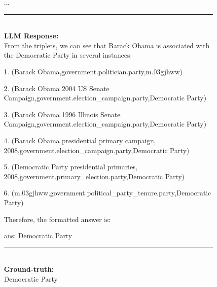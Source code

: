 \begin{figure}
\begin{tcolorbox}[colback=gray!5!white, colframe=gray!75!black, title=WebQSP-WebQTest-760]
...

\rule{\linewidth}{0.4pt}
\\

\textbf{LLM Response:}\\
From the triplets, we can see that Barack Obama is associated with the Democratic Party in several instances:



1. (Barack Obama,government.politician.party,m.03gjhww)

2. (Barack Obama 2004 US Senate Campaign,government.election\_campaign.party,Democratic Party)

3. (Barack Obama 1996 Illinois Senate Campaign,government.election\_campaign.party,Democratic Party)

4. (Barack Obama presidential primary campaign, 2008,government.election\_campaign.party,Democratic Party)

5. (Democratic Party presidential primaries, 2008,government.primary\_election.party,Democratic Party)

6. (m.03gjhww,government.political\_party\_tenure.party,Democratic Party)



Therefore, the formatted answer is:



ans: Democratic Party

\rule{\linewidth}{0.4pt}
\\
\textbf{Ground-truth:}\\
Democratic Party

\end{tcolorbox}
\end{figure}



